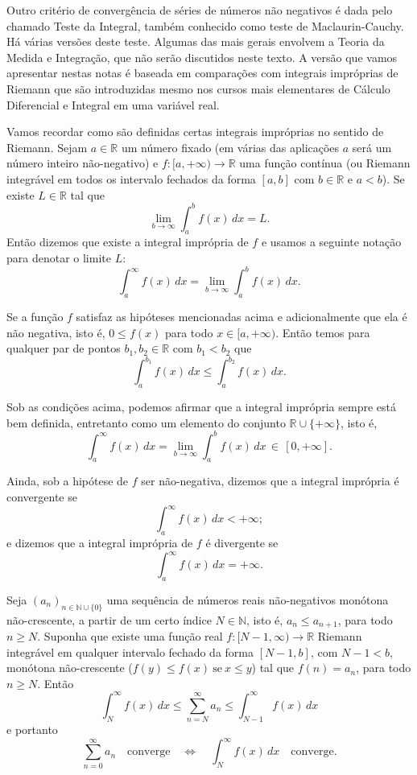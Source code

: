 Outro critério de convergência de séries de números não negativos é dada pelo
chamado Teste da Integral, também conhecido como teste de Maclaurin-Cauchy.
Há várias versões deste teste. Algumas das mais gerais 
envolvem a Teoria da Medida e Integração, que não serão discutidos
neste texto. A versão que vamos apresentar nestas notas é baseada em comparações com 
integrais impróprias de Riemann que são introduzidas mesmo nos cursos mais elementares
de Cálculo Diferencial e Integral em uma variável real. 

Vamos recordar como são definidas certas integrais impróprias no sentido de Riemann. 
Sejam $a\in\mathbb{R}$ um número fixado (em várias das aplicações $a$ será
um número inteiro não-negativo) e $f:[a,+\infty)\to \mathbb{R}$ uma função contínua
(ou Riemann integrável em todos os intervalo fechados da forma $[a,b]$ com $b\in\mathbb{R}$
e $a<b$). Se existe $L\in\mathbb{R}$ tal que 
\[
\lim_{b\to\infty} \int_{a}^{b} f(x)\, dx = L.
\]
Então dizemos que existe a integral imprópria de $f$ e usamos a seguinte notação para denotar
o limite $L$:
\[
\int_{a}^{\infty} f(x)\, dx = \lim_{b\to\infty} \int_{a}^{b} f(x)\, dx.
\]

Se a função $f$ satisfaz as hipóteses mencionadas acima e adicionalmente que ela é não negativa, isto é, $0\leqslant f(x)$ para todo $x\in[a,+\infty)$. Então 
temos para qualquer par de pontos $b_1,b_2\in\mathbb{R}$ com $b_1<b_2$ que  
\[
\int_{a}^{b_1}f(x)\, dx \leqslant \int_{a}^{b_2}f(x)\, dx.
\]

Sob as condições acima, podemos afirmar que a integral imprópria sempre está bem definida,
entretanto como um elemento do conjunto $\mathbb{R}\cup\{+\infty\}$, isto é,
\[
\int_{a}^{\infty} f(x)\, dx 
= 
\lim_{b\to\infty} \int_{a}^{b} f(x)\, dx 
\, \in \, [0,+\infty].
\] 

Ainda, sob a hipótese de $f$ ser não-negativa, dizemos que a integral imprópria
é convergente se
\[
\int_{a}^{\infty} f(x)\, dx <+\infty;
\]
e dizemos que a integral imprópria de $f$ é divergente se 
\[
\int_{a}^{\infty} f(x)\, dx =+\infty.
\]


\begin{teorema}
\label{teo-teste-da-integral}
Seja $(a_n)_{n\in\mathbb{N}\cup\{0\}}$ uma sequência de números reais não-negativos
monótona não-crescente, a partir de um certo índice $N\in\mathbb{N}$, 
isto é, $a_{n}\leqslant a_{n+1}$, para todo $n\geqslant N$. Suponha 
que existe uma função real $f:[N-1,\infty)\to\mathbb{R}$ Riemann integrável em
qualquer intervalo fechado da forma $[N-1,b]$, com $N-1<b$,
monótona não-crescente ($f(y)\leqslant f(x)\ \text{se}\ x\leqslant y$) 
tal que $f(n)=a_n$, para todo $n\geqslant N$. Então
\[
\int_{N}^{\infty} f(x)\, dx
\leqslant 
\sum_{n=N}^{\infty} a_n
\leqslant
\int_{N-1}^{\infty} f(x)\, dx
\] 
e portanto 
\[
\sum_{n=0}^{\infty} a_n \quad \text{converge}
\quad\Longleftrightarrow\quad
\int_{N}^{\infty} f(x)\, dx \quad \text{converge}.
\]
\end{teorema}

